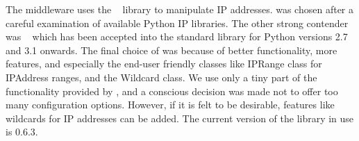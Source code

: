 \label{sec:external}
The middleware uses the \netaddr~\cite{url:netaddr} library to
manipulate IP addresses. \netaddr was chosen after a careful
examination of available Python IP libraries. The other strong
contender was \ipaddr~\cite{url:ipaddr} which has been accepted
into the standard library for Python versions 2.7 and 3.1
onwards. The final choice of \netaddr was because of better
functionality, more features, and especially the end-user
friendly classes like IPRange class for IPAddress ranges, and the
Wildcard class. We use only a tiny part of the functionality
provided by \netaddr, and a conscious decision was made not to
offer too many configuration options. However, if it is felt to
be desirable, features like wildcards for IP addresses can be
added. The current version of the library in use is 0.6.3.

